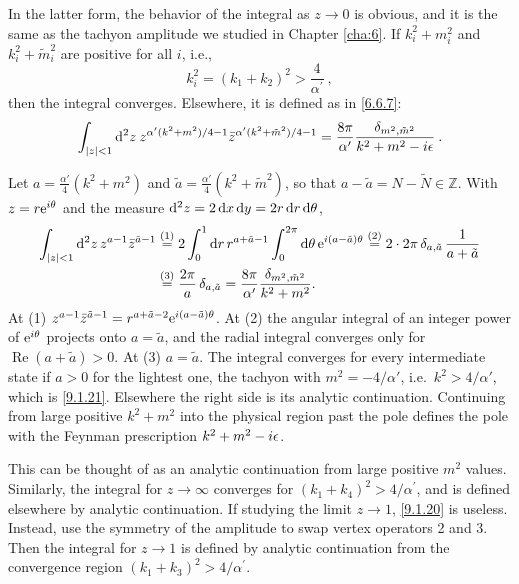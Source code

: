 In the latter form, the behavior of the integral as $z \rightarrow 0$ is obvious, and it is the same as the tachyon amplitude we studied in Chapter \ref{cha:6}. 
If $k_{i}^{2}+m_{i}^{2}$ and $k_{i}^{2}+\tilde{m}_{i}^{2}$ are positive for all $i$, i.e.,
\begin{equation}
	k_{i}^{2}=\left(k_{1}+k_{2}\right)^{2}>\frac{4}{\alpha^{\prime}} \:, \label{9.1.21}
\end{equation}
then the integral converges.
Elsewhere, it is defined as in \eqref{6.6.7}:
\begin{equation}
	\int_{|z|<1} \mathrm{d}^{2} z \: z^{\alpha^{\prime}(k^{2}+m^{2})/4 - 1} \bar{z}^{\alpha^{\prime}(k^{2}+\tilde{m}^{2})/4 - 1}
	=\frac{8 \pi}{\alpha^{\prime}} \frac{\delta_{m^{2}, \tilde{m}^{2}}}{k^{2} + m^{2} - i \epsilon} \:.
	\label{9.1.22}
\end{equation}
\begin{tcolorbox}[breakable]
	\begin{remark}
		Let $a=\frac{\alpha'}{4}(k^2+m^2)$ and $\tilde a=\frac{\alpha'}{4}(k^2+\tilde m^2)$, so that $a-\tilde a=N-\tilde N\in\mathbb Z$. With $z=r\mathrm{e}^{i\theta}$ and the measure $\mathrm{d}^2z=2\,\mathrm{d} x\,\mathrm{d} y=2r\,\mathrm{d} r\,\mathrm{d}\theta$,
		\begin{align*}
			\int_{|z|<1}\mathrm{d}^2z\,z^{a-1}\bar z^{\tilde a-1}
			&\overset{(1)}{=} 2\int_0^1\mathrm{d} r\,r^{a+\tilde a-1}\int_0^{2\pi}\mathrm{d}\theta\,\mathrm{e}^{i(a-\tilde a)\theta}
			\overset{(2)}{=} 2\cdot2\pi\,\delta_{a,\tilde a}\,\frac{1}{a+\tilde a}\\
			&\overset{(3)}{=} \frac{2\pi}{a}\,\delta_{a,\tilde a}=\frac{8\pi}{\alpha'}\frac{\delta_{m^2,\tilde m^2}}{k^2+m^2} .
		\end{align*}
		At (1) $z^{a-1}\bar z^{\tilde a-1}=r^{a+\tilde a-2}\mathrm{e}^{i(a-\tilde a)\theta}$. At (2) the angular integral of an integer power of $\mathrm{e}^{i\theta}$ projects onto $a=\tilde a$, and the radial integral converges only for $\operatorname{Re}(a+\tilde a)>0$. At (3) $a=\tilde a$. The integral converges for every intermediate state if $a>0$ for the lightest one, the tachyon with $m^2=-4/\alpha'$, i.e.\ $k^2>4/\alpha'$, which is \eqref{9.1.21}. Elsewhere the right side is its analytic continuation. Continuing from large positive $k^2+m^2$ into the physical region past the pole defines the pole with the Feynman prescription $k^2+m^2-i\epsilon$.
	\end{remark}
\end{tcolorbox}
This can be thought of as an analytic continuation from large positive $m^{2}$ values. Similarly, the integral for $z \rightarrow \infty$ converges for $(k_{1}+k_{4})^{2}>4 / \alpha^{\prime}$, 
and is defined elsewhere by analytic continuation. If studying the limit $z \rightarrow 1$, \eqref{9.1.20} is useless. Instead, use the symmetry of the amplitude to swap vertex operators 2 and 3.
Then the integral for $z \rightarrow 1$ is defined by analytic continuation from the convergence region $(k_{1}+k_{3})^{2}>4 / \alpha^{\prime} $.

